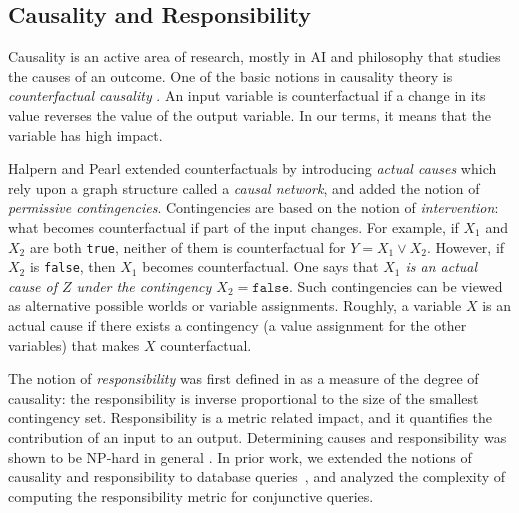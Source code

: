 \subsection*{Causality and Responsibility}
Causality is an active area of research, mostly in AI and philosophy that
studies the causes of an outcome. One of the basic notions in causality theory
is \emph{counterfactual causality} \cite{Menzies:Causation2008,Lewis1973}. An
input variable is counterfactual if a change in its value reverses the value
of the output variable. In our terms, it means that the variable has high
impact. 

Halpern and Pearl \cite{HalpernPearl:Cause2005} extended counterfactuals by
introducing \emph{actual causes} which rely upon a graph structure called a
\emph{causal network}, and added the notion of \emph{permissive
contingencies}. 
Contingencies are based on the notion of \emph{intervention}: what becomes
counterfactual if part of the input changes. For example, if $X_1$ and $X_2$
are both \texttt{true}, neither of them is counterfactual for $Y=X_1 \vee
X_2$. However, if $X_2$ is
\texttt{false}, then $X_1$ becomes counterfactual. One says that \emph{$X_1$
is an actual cause of $Z$ under the contingency $X_2=\texttt{false}$}. Such
contingencies can be viewed as alternative possible worlds or variable
assignments. Roughly, a variable $X$ is an actual cause if there exists a
contingency (a value assignment for the other variables) that makes $X$
counterfactual.

The notion of \emph{responsibility} was first defined in
\cite{DBLP:journals/jair/ChocklerH04} as a measure of the degree of causality:
the responsibility is inverse proportional to the size of the smallest
contingency set. Responsibility is a metric related impact, and it quantifies
the contribution of an input to an output. Determining causes and
responsibility was shown to be NP-hard in general
\cite{DBLP:journals/ai/EiterL02}. In prior work, we extended the notions of causality and responsibility to
database queries~\cite{DBLP:journals/pvldb/MeliouGMS11}, and analyzed the complexity of computing the responsibility metric for conjunctive queries.


